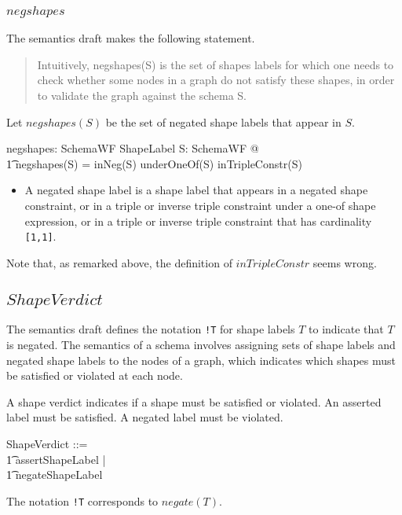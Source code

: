 \documentclass{article}
\begin{document}
\subsubsection{$negshapes$}
The semantics draft makes the following statement.
\begin{quote}
Intuitively, negshapes(S) is the set of shapes labels for which one needs to check whether some nodes in a graph do not satisfy these shapes, in order to validate the graph against the schema S.
\end{quote}

Let $negshapes(S)$ be the set of negated shape labels that appear in $S$.
\begin{axdef}
	negshapes: SchemaWF \fun \finset ShapeLabel
\where
	\forall S: SchemaWF @ \\
\t1		negshapes(S) = inNeg(S) \cup underOneOf(S) \cup inTripleConstr(S)
\end{axdef}
\begin{itemize}
\item A negated shape label is a shape label that appears in a negated shape constraint, or in a triple or inverse triple constraint under a one-of shape expression, or in a triple or inverse triple constraint that has cardinality {\tt [1,1]}.
\end{itemize}
Note that, as remarked above, the definition of $inTripleConstr$ seems wrong.

\subsection{$ShapeVerdict$}
The semantics draft defines the notation {\tt !T} for shape labels $T$ to indicate that $T$ is negated.
The semantics of a schema involves assigning sets of shape labels and negated shape labels to the nodes of a graph, 
which indicates which shapes must be satisfied or violated at each node. 

A shape verdict indicates if a shape must be satisfied or violated.
An asserted label must be satisfied.
A negated label must be violated.
\begin{zed}
	ShapeVerdict ::= \\
\t1		assert\ldata ShapeLabel \rdata | \\
\t1		negate\ldata ShapeLabel \rdata
\end{zed}

The notation {\tt !T} corresponds to $negate(T)$.
\end{document}
